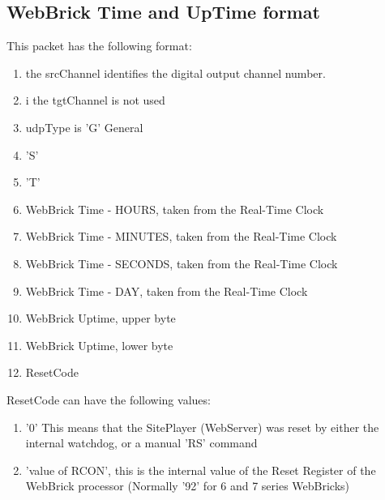 \subsection{WebBrick Time and UpTime format}


This packet has the following format:

\begin{enumerate}
\item  the srcChannel identifies the digital output channel number.
\item i the tgtChannel is not used
\item  udpType is 'G' General
\item  'S'
\item  'T'
\item  WebBrick Time - HOURS, taken from the Real-Time Clock
\item  WebBrick Time - MINUTES, taken from the Real-Time Clock
\item  WebBrick Time - SECONDS, taken from the Real-Time Clock
\item  WebBrick Time - DAY, taken from the Real-Time Clock
\item  WebBrick Uptime, upper byte
\item  WebBrick Uptime, lower byte
\item  ResetCode\\
\end{enumerate}

ResetCode can have the following values:

\begin{enumerate}
\item  '0' This means that the SitePlayer (WebServer) was reset by either the internal watchdog, or a manual 'RS' command
\item 'value of RCON', this is the internal value of the Reset Register of the WebBrick processor (Normally '92' for 6 and 7 series WebBricks) \\
\end{enumerate}




